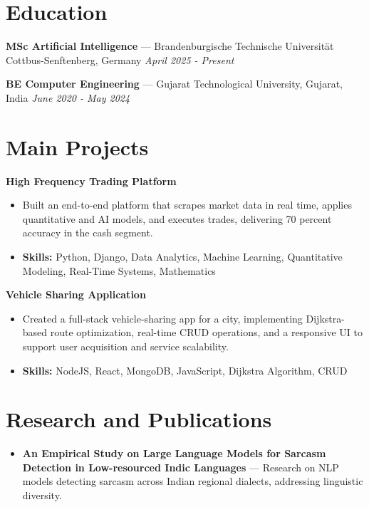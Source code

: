 \documentclass[a4paper,10pt]{article}
\begin{document}
\section*{Education}
\textbf{MSc Artificial Intelligence} — Brandenburgische Technische Universität Cottbus-Senftenberg, Germany \hfill \textit{April 2025 - Present}\par
\vspace{1.5pt}
\textbf{BE Computer Engineering} — Gujarat Technological University, Gujarat, India \hfill \textit{June 2020 - May 2024}\par

\section*{Main Projects}
\textbf{High Frequency Trading Platform}\par
\vspace{1pt}
\begin{itemize}
  \item Built an end-to-end platform that scrapes market data in real time, applies quantitative and AI models, and executes trades, delivering 70 percent accuracy in the cash segment.
  \item \textbf{Skills:} Python, Django, Data Analytics, Machine Learning, Quantitative Modeling, Real-Time Systems, Mathematics
\end{itemize}
\vspace{3pt}
\textbf{Vehicle Sharing Application}\par
\vspace{1pt}
\begin{itemize}
  \item Created a full-stack vehicle-sharing app for a city, implementing Dijkstra-based route optimization, real-time CRUD operations, and a responsive UI to support user acquisition and service scalability.
  \item \textbf{Skills:} NodeJS, React, MongoDB, JavaScript, Dijkstra Algorithm, CRUD
\end{itemize}

\section*{Research and Publications}
\begin{itemize}
\item \textbf{An Empirical Study on Large Language Models for Sarcasm Detection in Low-resourced Indic Languages} — Research on NLP models detecting sarcasm across Indian regional dialects, addressing linguistic diversity.
\end{itemize}
\end{document}
